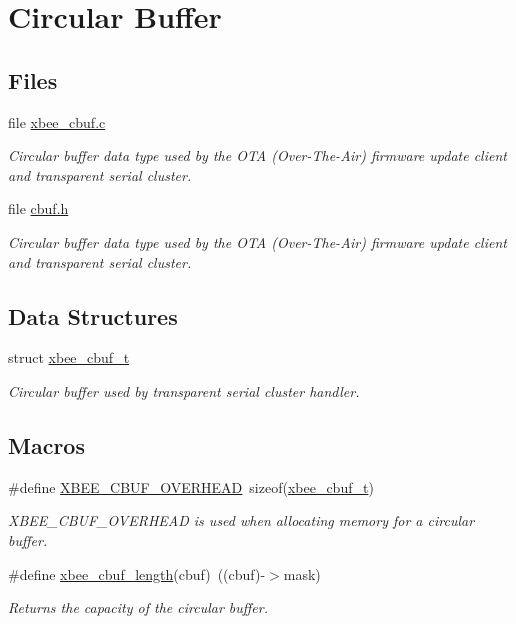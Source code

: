 \hypertarget{group__util__cbuf}{}\section{Circular Buffer}
\label{group__util__cbuf}
\subsection*{Files}
\begin{DoxyCompactItemize}
\item 
file \hyperlink{xbee__cbuf_8c}{xbee\+\_\+cbuf.\+c}
\begin{DoxyCompactList}\small\item\em Circular buffer data type used by the O\+TA (Over-\/\+The-\/\+Air) firmware update client and transparent serial cluster. \end{DoxyCompactList}\item 
file \hyperlink{cbuf_8h}{cbuf.\+h}
\begin{DoxyCompactList}\small\item\em Circular buffer data type used by the O\+TA (Over-\/\+The-\/\+Air) firmware update client and transparent serial cluster. \end{DoxyCompactList}\end{DoxyCompactItemize}
\subsection*{Data Structures}
\begin{DoxyCompactItemize}
\item 
struct \hyperlink{structxbee__cbuf__t}{xbee\+\_\+cbuf\+\_\+t}
\begin{DoxyCompactList}\small\item\em Circular buffer used by transparent serial cluster handler. \end{DoxyCompactList}\end{DoxyCompactItemize}
\subsection*{Macros}
\begin{DoxyCompactItemize}
\item 
\#define \hyperlink{group__util__cbuf_ga6fb73f000c9aa3d2b26f3ae089676bfa}{X\+B\+E\+E\+\_\+\+C\+B\+U\+F\+\_\+\+O\+V\+E\+R\+H\+E\+AD}~sizeof(\hyperlink{structxbee__cbuf__t}{xbee\+\_\+cbuf\+\_\+t})
\begin{DoxyCompactList}\small\item\em X\+B\+E\+E\+\_\+\+C\+B\+U\+F\+\_\+\+O\+V\+E\+R\+H\+E\+AD is used when allocating memory for a circular buffer. \end{DoxyCompactList}\item 
\#define \hyperlink{group__util__cbuf_gaa3f9edea3274c2d62f09768c38fe6a1d}{xbee\+\_\+cbuf\+\_\+length}(cbuf)~((cbuf)-\/$>$mask)
\begin{DoxyCompactList}\small\item\em Returns the capacity of the circular buffer. \end{DoxyCompactList}\end{DoxyCompactItemize}
